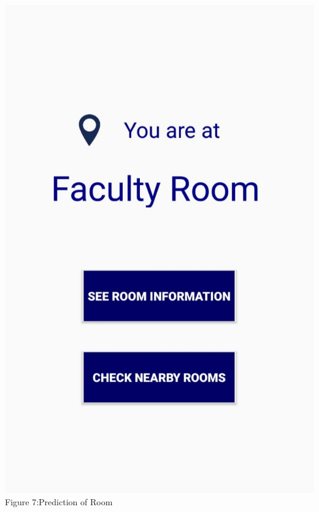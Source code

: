 \documentclass{article}
\begin{document}
\begin{center}

\includegraphics[scale=0.2]{f2}
\\Figure 7:Prediction of Room
\end{center}
\end{document}
